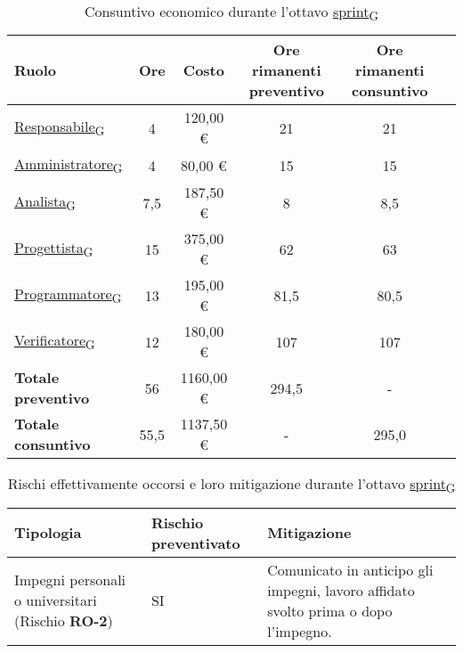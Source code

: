 \newpage
{} 
\begin{table}[!h]
    \centering
    \begin{tabular}{ | l | c | c | c | c | c | }
        \hline
        \textbf{Ruolo} & \textbf{Ore} & \textbf{Costo} & \textbf{Ore rimanenti preventivo} & \textbf{Ore rimanenti consuntivo} \\
        \hline
        \href{https://7last.github.io/docs/pb/documentazione-interna/glossario\#responsabile}{Responsabile\textsubscript{G}}     &  4   &    120,00 € &  21   &  21   \\
        \href{https://7last.github.io/docs/pb/documentazione-interna/glossario\#amministratore}{Amministratore\textsubscript{G}} &  4   &     80,00 € &  15   &  15   \\
        \href{https://7last.github.io/docs/pb/documentazione-interna/glossario\#analista}{Analista\textsubscript{G}}             &  7,5 &    187,50 € &   8   &   8,5 \\
        \href{https://7last.github.io/docs/pb/documentazione-interna/glossario\#progettista}{Progettista\textsubscript{G}}       & 15   &    375,00 € &  62   &  63   \\
        \href{https://7last.github.io/docs/pb/documentazione-interna/glossario\#programmatore}{Programmatore\textsubscript{G}}   & 13   &    195,00 € &  81,5 &  80,5 \\
        \href{https://7last.github.io/docs/pb/documentazione-interna/glossario\#verificatore}{Verificatore\textsubscript{G}}     & 12   &    180,00 € & 107   & 107   \\
        \hline
        \textbf{Totale preventivo} &  56   & 1160,00 € & 294,5 &   -   \\
        \hline
        \textbf{Totale consuntivo} &  55,5 & 1137,50 € &   -   &  295,0 \\
        \hline
    \end{tabular}
    \caption{Consuntivo economico durante l'ottavo \href{https://7last.github.io/docs/pb/documentazione-interna/glossario\#sprint}{sprint\textsubscript{G}}}

\end{table}

\begin{table}[!h]
    \centering
    \begin{tabular}{ | p{6cm} | p{2.5cm} | p{7.5cm} | }
        \hline
        \textbf{Tipologia} & \textbf{Rischio preventivato} & \textbf{Mitigazione}  \\
        \hline
        Impegni personali o universitari (Rischio \textbf{RO-2})& SI & Comunicato in anticipo gli impegni, lavoro affidato svolto prima o dopo l’impegno. \\
        \hline
    \end{tabular}
    \caption{Rischi effettivamente occorsi e loro mitigazione durante l'ottavo \href{https://7last.github.io/docs/pb/documentazione-interna/glossario\#sprint}{sprint\textsubscript{G}}}
\end{table}

